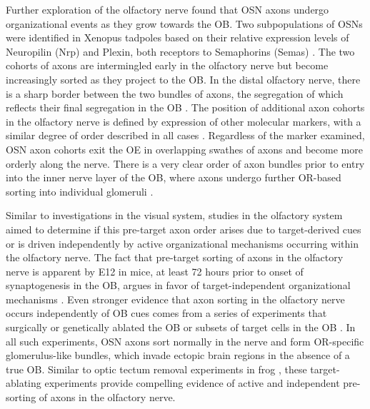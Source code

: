 Further exploration of the olfactory nerve found that OSN axons undergo organizational events as they grow towards the OB. 
Two subpopulations of OSNs were identified in Xenopus tadpoles based on their relative expression levels of Neuropilin (Nrp) and Plexin, both receptors to Semaphorins (Semas) \cite{satoda1995differential}. 
The two cohorts of axons are intermingled early in the olfactory nerve but become increasingly sorted as they project to the OB. 
In the distal olfactory nerve, there is a sharp border between the two bundles of axons, the segregation of which reflects their final segregation in the OB \cite{satoda1995differential}. 
The position of additional axon cohorts in the olfactory nerve is defined by expression of other molecular markers, with a similar degree of order described in all cases \cite{imai2009pre, miller2010axon}. 
Regardless of the marker examined, OSN axon cohorts exit the OE in overlapping swathes of axons and become more orderly along the nerve. 
There is a very clear order of axon bundles prior to entry into the inner nerve layer of the OB, where axons undergo further OR-based sorting into individual glomeruli \cite{imai2009pre, miller2010axon}.

Similar to investigations in the visual system, studies in the olfactory system aimed to determine if this pre-target axon order arises due to target-derived cues or is driven independently by active organizational mechanisms occurring within the olfactory nerve. 
The fact that pre-target sorting of axons in the olfactory nerve is apparent by E12 in mice, at least 72 hours prior to onset of synaptogenesis in the OB, argues in favor of target-independent organizational mechanisms \cite{miller2010axon}. 
Even stronger evidence that axon sorting in the olfactory nerve occurs independently of OB cues comes from a series of experiments that surgically \cite{graziadei1978regeneration} or genetically ablated the OB \cite{stjohn2003sorting} or subsets of target cells in the OB \cite{bulfone1998olfactory}. 
In all such experiments, OSN axons sort normally in the nerve and form OR-specific glomerulus-like bundles, which invade ectopic brain regions in the absence of a true OB. 
Similar to optic tectum removal experiments in frog \cite{reh1983organization}, these target-ablating experiments provide compelling evidence of active and independent pre-sorting of axons in the olfactory nerve.

